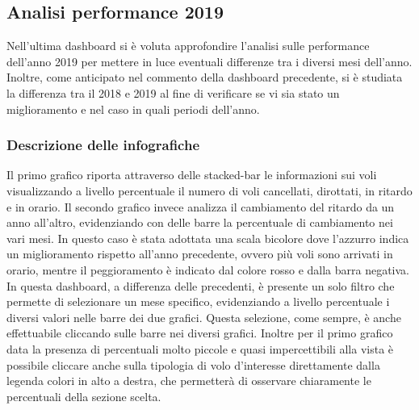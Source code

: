 \documentclass[12pt]{article}
\begin{document}
\newpage
\subsection {Analisi performance 2019}
Nell'ultima dashboard si è voluta approfondire l'analisi sulle performance dell'anno 2019 per mettere in luce eventuali differenze tra i diversi mesi dell'anno. Inoltre, come anticipato nel commento della dashboard precedente, si è studiata la differenza tra il 2018 e 2019 al fine di verificare se vi sia stato un miglioramento e nel caso in quali periodi dell'anno.

\subsubsection{Descrizione delle infografiche}
Il primo grafico riporta attraverso delle stacked-bar le informazioni sui voli visualizzando a livello percentuale il numero di voli cancellati, dirottati, in ritardo e in orario.
Il secondo grafico invece analizza il cambiamento del ritardo da un anno all'altro, evidenziando con delle barre la percentuale di cambiamento nei vari mesi. In questo caso è stata adottata una scala bicolore dove l'azzurro indica un miglioramento rispetto all'anno precedente, ovvero più voli sono arrivati in orario, mentre il peggioramento è indicato dal colore rosso e dalla barra negativa.\\
In questa dashboard, a differenza delle precedenti, è presente un solo filtro che permette di selezionare un mese specifico, evidenziando a livello percentuale i diversi valori nelle barre dei due grafici. Questa selezione, come sempre, è anche effettuabile cliccando sulle barre nei diversi grafici. Inoltre per il primo grafico data la presenza di percentuali molto piccole e quasi impercettibili alla vista è possibile cliccare anche sulla tipologia di volo d'interesse direttamente dalla legenda colori in alto a destra, che permetterà di osservare chiaramente le percentuali della sezione scelta.
\end{document}

